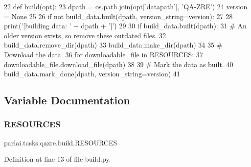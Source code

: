 \begin{DoxyCode}
22 \textcolor{keyword}{def }\hyperlink{namespacedialog__babi__feedback_1_1build_a7a9d289f7493a5ded13c4b7f071b6184}{build}(opt):
23     dpath = os.path.join(opt[\textcolor{stringliteral}{'datapath'}], \textcolor{stringliteral}{'QA-ZRE'})
24     version = \textcolor{keywordtype}{None}
25 
26     \textcolor{keywordflow}{if} \textcolor{keywordflow}{not} build\_data.built(dpath, version\_string=version):
27 
28         print(\textcolor{stringliteral}{'[building data: '} + dpath + \textcolor{stringliteral}{']'})
29 
30         \textcolor{keywordflow}{if} build\_data.built(dpath):
31             \textcolor{comment}{# An older version exists, so remove these outdated files.}
32             build\_data.remove\_dir(dpath)
33         build\_data.make\_dir(dpath)
34 
35         \textcolor{comment}{# Download the data.}
36         \textcolor{keywordflow}{for} downloadable\_file \textcolor{keywordflow}{in} RESOURCES:
37             downloadable\_file.download\_file(dpath)
38 
39         \textcolor{comment}{# Mark the data as built.}
40         build\_data.mark\_done(dpath, version\_string=version)
41 \end{DoxyCode}


\subsection{Variable Documentation}
\mbox{\label{namespaceparlai_1_1tasks_1_1qazre_1_1build_ae5e7baf49cee2df090ba6411d4fb2dc2}} 
\subsubsection{\texorpdfstring{R\+E\+S\+O\+U\+R\+C\+ES}{RESOURCES}}
{\footnotesize\ttfamily parlai.\+tasks.\+qazre.\+build.\+R\+E\+S\+O\+U\+R\+C\+ES}



Definition at line 13 of file build.\+py.

